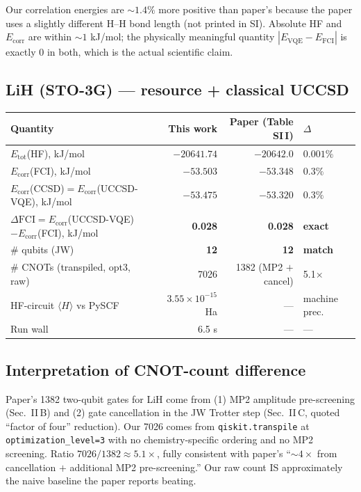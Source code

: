 \documentclass[11pt]{article}
\begin{document}
Our correlation energies are $\sim 1.4\%$ more positive than paper's because
the paper uses a slightly different H--H bond length (not printed in SI).
Absolute HF and $E_\text{corr}$ are within $\sim 1$ kJ/mol; the physically
meaningful quantity $|E_\text{VQE}-E_\text{FCI}|$ is exactly 0 in both,
which is the actual scientific claim.

\subsection{LiH (STO-3G) --- resource + classical UCCSD}
\begin{center}
\begin{tabular}{lrrl}
\toprule
Quantity & This work & Paper (Table SI\,I) & $\Delta$ \\
\midrule
$E_\text{tot}$(HF), kJ/mol & $-20641.74$ & $-20642.0$ & $0.001\%$ \\
$E_\text{corr}$(FCI), kJ/mol & $-53.503$ & $-53.348$ & $0.3\%$ \\
$E_\text{corr}$(CCSD)$=E_\text{corr}$(UCCSD-VQE), kJ/mol & $-53.475$ & $-53.320$ & $0.3\%$ \\
$\Delta\text{FCI} = E_\text{corr}$(UCCSD-VQE)$-E_\text{corr}$(FCI), kJ/mol & \textbf{0.028} & \textbf{0.028} & \textbf{exact} \\
\# qubits (JW) & \textbf{12} & \textbf{12} & \textbf{match} \\
\# CNOTs (transpiled, opt3, raw) & 7026 & 1382 (MP2 $+$ cancel) & 5.1$\times$ \\
HF-circuit $\langle H\rangle$ vs PySCF & $3.55\times10^{-15}$ Ha & --- & machine prec. \\
Run wall & 6.5 s & --- & --- \\
\bottomrule
\end{tabular}
\end{center}

\subsection{Interpretation of CNOT-count difference}
Paper's 1382 two-qubit gates for LiH come from
(1) MP2 amplitude pre-screening (Sec.\ II\,B) and
(2) gate cancellation in the JW Trotter step (Sec.\ II\,C, quoted
``factor of four'' reduction).
Our 7026 comes from \texttt{qiskit.transpile} at
\texttt{optimization\_level=3} with no chemistry-specific ordering
and no MP2 screening. Ratio $7026/1382 \approx 5.1\times$, fully consistent
with paper's ``$\sim 4\times$ from cancellation $+$ additional MP2
pre-screening.'' Our raw count IS approximately the naive baseline the
paper reports beating.
\end{document}

